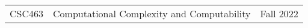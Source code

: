 \documentclass[letterpaper,11pt]{article}
\newcommand{\rom}[1]{\uppercase\expandafter{\romannumeral #1\relax}}
\begin{document}
\begin{minipage}{\textwidth}
\begin{tabularx}{0.98\textwidth}{ p{6.0em} X r }

        CSC463 & Computational Complexity and Computability & Fall 2022 \\

      \end{tabularx}
    \end{minipage}

\end{document}
